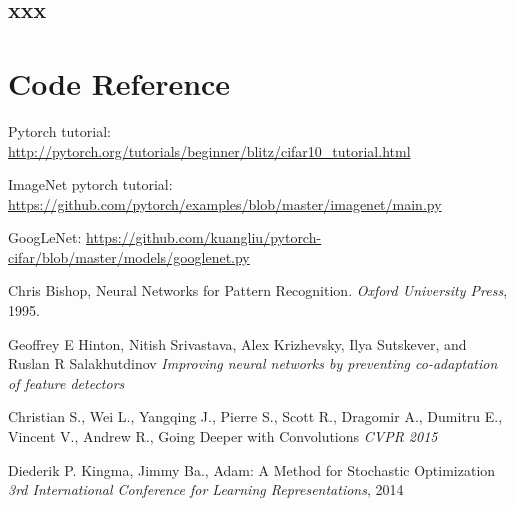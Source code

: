 \documentclass{article} %
\begin{document}
\subsection{xxx}

\section{Code Reference}
Pytorch tutorial: \url{http://pytorch.org/tutorials/beginner/blitz/cifar10_tutorial.html}\

ImageNet pytorch tutorial: \url{https://github.com/pytorch/examples/blob/master/imagenet/main.py}\

GoogLeNet: \url{https://github.com/kuangliu/pytorch-cifar/blob/master/models/googlenet.py}\

\begin{thebibliography}{9}

 Chris Bishop, Neural Networks for Pattern Recognition.
 \emph{Oxford University Press}, 1995.
 
Geoffrey E Hinton, Nitish Srivastava, Alex Krizhevsky, Ilya Sutskever, and Ruslan R Salakhutdinov
 \emph{Improving neural networks by preventing co-adaptation of feature detectors}

Christian S., Wei L., Yangqing J., Pierre S., Scott R., Dragomir A., Dumitru E.,
Vincent V., Andrew R., Going Deeper with Convolutions
\emph{CVPR 2015}

Diederik P. Kingma, Jimmy Ba., Adam: A Method for Stochastic Optimization
 \emph{3rd International Conference for Learning Representations}, 2014

\end{thebibliography}
\end{document}
